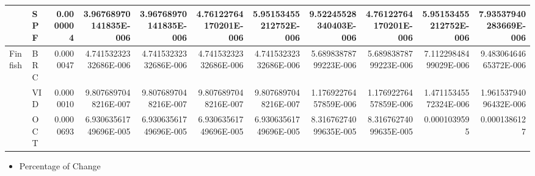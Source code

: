 \documentclass[11pt]{article}
\begin{document}
\begin{center}
\begin{tabular}{llrrrrrrrrr}
              &  SPF  &      0.0000004  &  3.96768970141835E-006  &  3.96768970141835E-006  &  4.76122764170201E-006  &  5.95153455212752E-006  &  9.52245528340403E-006  &  4.76122764170201E-006  &  5.95153455212752E-006  &  7.93537940283669E-006  \\
\hline
 Finfish      &  BRC  &      0.0000047  &  4.74153232332686E-006  &  4.74153232332686E-006  &  4.74153232332686E-006  &  4.74153232332686E-006  &  5.68983878799223E-006  &  5.68983878799223E-006  &  7.11229848499029E-006  &  9.48306464665372E-006  \\
              &  VID  &      0.0000010  &   9.8076897048216E-007  &   9.8076897048216E-007  &   9.8076897048216E-007  &   9.8076897048216E-007  &  1.17692276457859E-006  &  1.17692276457859E-006  &  1.47115345572324E-006  &  1.96153794096432E-006  \\
              &  OCT  &      0.0000693  &  6.93063561749696E-005  &  6.93063561749696E-005  &  6.93063561749696E-005  &  6.93063561749696E-005  &  8.31676274099635E-005  &  8.31676274099635E-005  &           0.0001039595  &           0.0001386127  \\
\end{tabular}
\end{center}




\begin{itemize}
\item Percentage of Change
\end{itemize}
\end{document}
